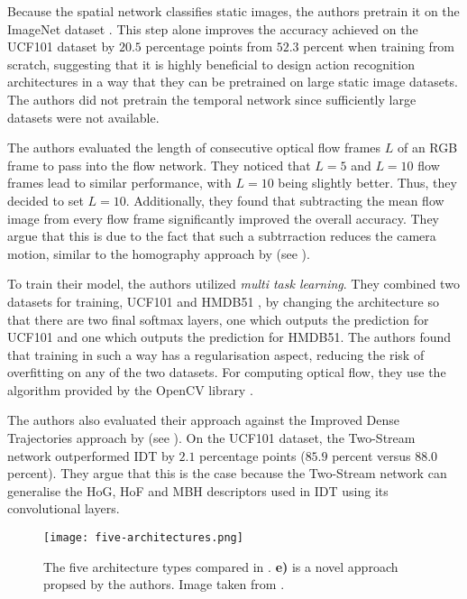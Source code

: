 Because the spatial network classifies static images, the authors pretrain it on the ImageNet dataset \cite{deng_imagenet:_2009}.
This step alone improves the accuracy achieved on the UCF101 dataset by $20.5$ percentage points from $52.3$ percent when training from scratch, suggesting that it is highly beneficial to design action recognition architectures in a way that they can be pretrained on large static image datasets.
The authors did not pretrain the temporal network since sufficiently large datasets were not available.

The authors evaluated the length of consecutive optical flow frames $L$ of an RGB frame to pass into the flow network.
They noticed that $L=5$ and $L=10$ flow frames lead to similar performance, with $L=10$ being slightly better.
Thus, they decided to set $L=10$.
Additionally, they found that subtracting the mean flow image from every flow frame significantly improved the overall accuracy.
They argue that this is due to the fact that such a subtrraction reduces the camera motion, similar to the homography approach by \cite{wang_action_2013} (see ).

To train their model, the authors utilized \textit{multi task learning}.
They combined two datasets for training, UCF101 and HMDB51 \cite{kuehne_hmdb:_2011}, 
by changing the architecture so that there are two final softmax layers, one which outputs the prediction for UCF101 and one which outputs the prediction for HMDB51.
The authors found that training in such a way has a regularisation aspect, reducing the risk of overfitting on any of the two datasets.
For computing optical flow, they use the algorithm provided by the OpenCV library \cite{bradski_opencv_2000}.

The authors also evaluated their approach against the Improved Dense Trajectories approach by \cite{wang_action_2013} (see ).
On the UCF101 dataset, the Two-Stream network outperformed IDT by $2.1$ percentage points ($85.9$ percent versus $88.0$ percent). 
They argue that this is the case because the Two-Stream network can generalise the HoG, HoF and MBH descriptors used in IDT using its convolutional layers.

\begin{figure}[htb!]
    \centering
    \texttt{[image: five-architectures.png]}
    \caption{The five architecture types compared in \cite{carreira_quo_2017}. \textbf{e)} is a novel approach propsed by the authors. Image taken from \cite{carreira_quo_2017}. }
    \label{fig:five-architectures}
\end{figure}


